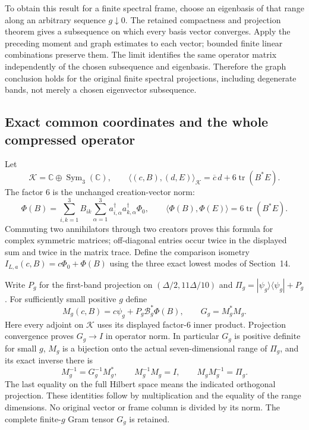 To obtain this result for a finite spectral frame, choose an eigenbasis
of that range along an arbitrary sequence $g\downarrow0$.
The retained compactness and projection theorem gives a subsequence
on which every basis vector converges. Apply the preceding moment and
graph estimates to each vector; bounded finite linear combinations
preserve them. The limit identifies the same operator matrix
independently of the chosen subsequence and eigenbasis. Therefore the
graph conclusion holds for the original finite spectral projections,
including degenerate bands, not merely a chosen eigenvector subsequence.

\subsection{Exact common coordinates and the whole compressed operator}

Let
\[
 \mathcal K=\mathbb C\oplus\operatorname{Sym}_3(\mathbb C),\qquad
 \langle(c,B),(d,E)\rangle_{\mathcal K}
 =\overline c\,d+6\operatorname{tr}(B^*E).
\]
The factor $6$ is the unchanged creation-vector norm:
\[
 \Phi(B)=\sum_{i,k=1}^3B_{ik}
            \sum_{\alpha=1}^3a_{i,\alpha}^\dagger
                            a_{k,\alpha}^\dagger\Phi_0,
 \qquad \langle\Phi(B),\Phi(E)\rangle=6\operatorname{tr}(B^*E).
\]
Commuting two annihilators through two creators proves this formula
for complex symmetric matrices; off-diagonal entries occur twice in
the displayed sum and twice in the matrix trace. Define the comparison
isometry $I_{L,a}(c,B)=c\Phi_0+\Phi(B)$ using the three exact lowest
modes of Section~14.

Write $P_g$ for the first-band projection on
$(\Delta/2,11\Delta/10)$ and $\Pi_g=|\psi_g\rangle\langle\psi_g|+P_g$.
For sufficiently small positive $g$ define
\begin{equation}\label{eq:local-frame}
 M_g(c,B)=c\psi_g+P_g\mathcal B_g^*\Phi(B),\qquad G_g=M_g^*M_g.
\end{equation}
Here every adjoint on $\mathcal K$ uses its displayed factor-$6$
inner product. Projection convergence proves $G_g\to I$ in
operator norm. In particular $G_g$ is positive definite for small
$g$, $M_g$ is a bijection onto the actual seven-dimensional range
of $\Pi_g$, and its exact inverse there is
\[
 M_g^{-1}=G_g^{-1}M_g^*,\qquad
 M_g^{-1}M_g=I,\qquad M_gM_g^{-1}=\Pi_g.
\]
The last equality on the full Hilbert space means the indicated
orthogonal projection. These identities follow by multiplication and
the equality of the range dimensions. No original vector or frame
column is divided by its norm. The complete finite-$g$ Gram tensor
$G_g$ is retained.

